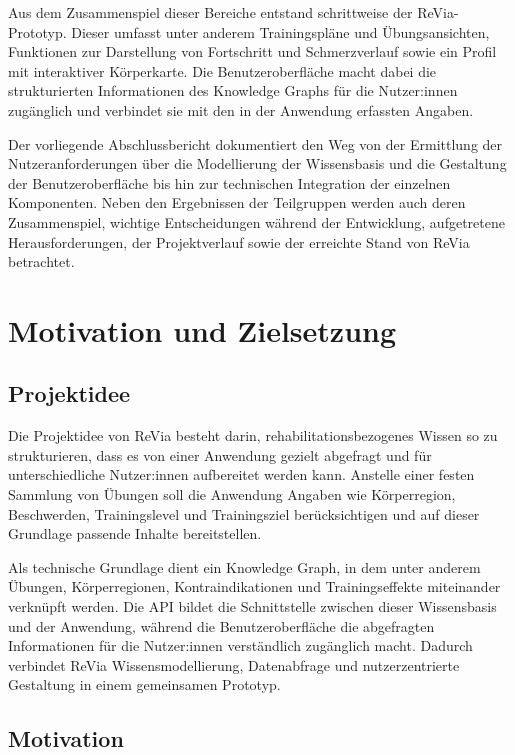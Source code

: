 Aus dem Zusammenspiel dieser Bereiche entstand schrittweise der ReVia-Prototyp. Dieser umfasst unter anderem Trainingspläne und Übungsansichten, Funktionen zur Darstellung von Fortschritt und Schmerzverlauf sowie ein Profil mit interaktiver Körperkarte. Die Benutzeroberfläche macht dabei die strukturierten Informationen des Knowledge Graphs für die Nutzer:innen zugänglich und verbindet sie mit den in der Anwendung erfassten Angaben.

Der vorliegende Abschlussbericht dokumentiert den Weg von der Ermittlung der Nutzeranforderungen über die Modellierung der Wissensbasis und die Gestaltung der Benutzeroberfläche bis hin zur technischen Integration der einzelnen Komponenten. Neben den Ergebnissen der Teilgruppen werden auch deren Zusammenspiel, wichtige Entscheidungen während der Entwicklung, aufgetretene Herausforderungen, der Projektverlauf sowie der erreichte Stand von ReVia betrachtet.

\section{Motivation und Zielsetzung}

\subsection{Projektidee}

Die Projektidee von ReVia besteht darin, rehabilitationsbezogenes Wissen so zu strukturieren, dass es von einer Anwendung gezielt abgefragt und für unterschiedliche Nutzer:innen aufbereitet werden kann. Anstelle einer festen Sammlung von Übungen soll die Anwendung Angaben wie Körperregion, Beschwerden, Trainingslevel und Trainingsziel berücksichtigen und auf dieser Grundlage passende Inhalte bereitstellen.

Als technische Grundlage dient ein Knowledge Graph, in dem unter anderem Übungen, Körperregionen, Kontraindikationen und Trainingseffekte miteinander verknüpft werden. Die API bildet die Schnittstelle zwischen dieser Wissensbasis und der Anwendung, während die Benutzeroberfläche die abgefragten Informationen für die Nutzer:innen verständlich zugänglich macht. Dadurch verbindet ReVia Wissensmodellierung, Datenabfrage und nutzerzentrierte Gestaltung in einem gemeinsamen Prototyp.

\subsection{Motivation}

